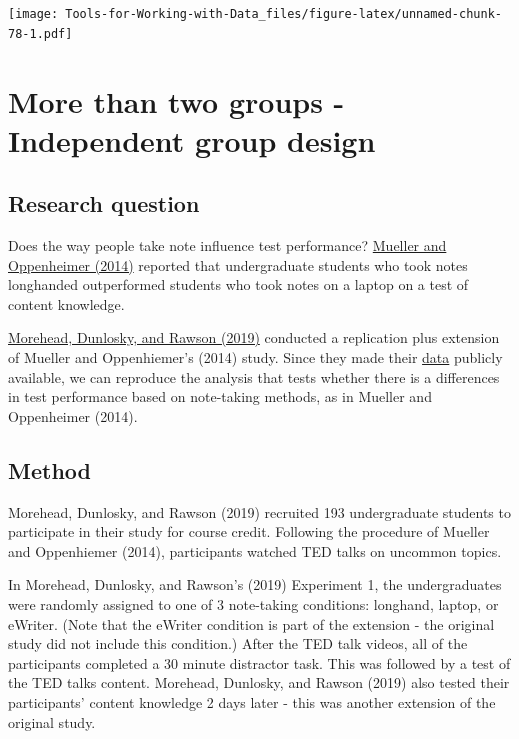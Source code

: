 \documentclass[
]{book}
\begin{document}
\texttt{[image: Tools-for-Working-with-Data\_files/figure-latex/unnamed-chunk-78-1.pdf]}

\hypertarget{more-than-two-groups---independent-group-design}{%
\section{More than two groups - Independent group design}\label{more-than-two-groups---independent-group-design}}

\hypertarget{research-question-2}{%
\subsection{Research question}\label{research-question-2}}

Does the way people take note influence test performance? \href{http://www.yaros.com/ipad/Pen_vs_Keyboard_Notes.pdf}{Mueller and Oppenheimer (2014)} reported that undergraduate students who took notes longhanded outperformed students who took notes on a laptop on a test of content knowledge.

\href{https://www.researchgate.net/publication/330856100_How_Much_Mightier_Is_the_Pen_than_the_Keyboard_for_Note-Taking_A_Replication_and_Extension_of_Mueller_and_Oppenheimer_2014}{Morehead, Dunlosky, and Rawson (2019)} conducted a replication plus extension of Mueller and Oppenhiemer's (2014) study. Since they made their \href{https://osf.io/dyga5/?view_only=843c2187b4894aefbfc6218b2d6eaed4}{data} publicly available, we can reproduce the analysis that tests whether there is a differences in test performance based on note-taking methods, as in Mueller and Oppenheimer (2014).

\hypertarget{method-2}{%
\subsection{Method}\label{method-2}}

Morehead, Dunlosky, and Rawson (2019) recruited 193 undergraduate students to participate in their study for course credit. Following the procedure of Mueller and Oppenhiemer (2014), participants watched TED talks on uncommon topics.

In Morehead, Dunlosky, and Rawson's (2019) Experiment 1, the undergraduates were randomly assigned to one of 3 note-taking conditions: longhand, laptop, or eWriter. (Note that the eWriter condition is part of the extension - the original study did not include this condition.) After the TED talk videos, all of the participants completed a 30 minute distractor task. This was followed by a test of the TED talks content. Morehead, Dunlosky, and Rawson (2019) also tested their participants' content knowledge 2 days later - this was another extension of the original study.
\end{document}

